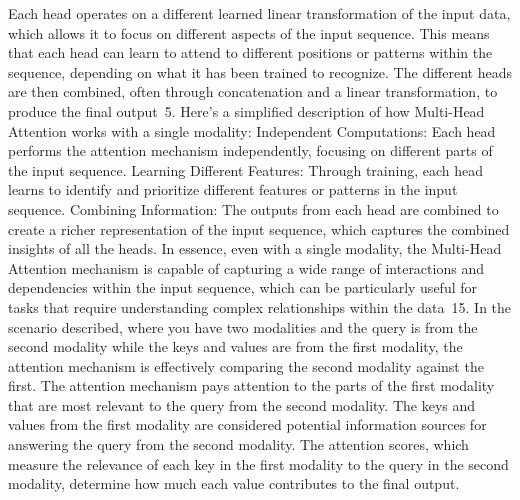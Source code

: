 \documentclass{article}%
\begin{document}
\newline%
%
Each head operates on a different learned linear transformation of the input data, which allows it to focus on different aspects of the input sequence. This means that each head can learn to attend to different positions or patterns within the sequence, depending on what it has been trained to recognize. The different heads are then combined, often through concatenation and a linear transformation, to produce the final output~5.%
\newline%
\newline%
%
Here's a simplified description of how Multi{-}Head Attention works with a single modality:%
\newline%
\newline%
%
Independent Computations: Each head performs the attention mechanism independently, focusing on different parts of the input sequence.%
\newline%
\newline%
%
Learning Different Features: Through training, each head learns to identify and prioritize different features or patterns in the input sequence.%
\newline%
\newline%
%
Combining Information: The outputs from each head are combined to create a richer representation of the input sequence, which captures the combined insights of all the heads.%
\newline%
\newline%
%
In essence, even with a single modality, the Multi{-}Head Attention mechanism is capable of capturing a wide range of interactions and dependencies within the input sequence, which can be particularly useful for tasks that require understanding complex relationships within the data~15.%
\newline%
\newline%
%
In the scenario described, where you have two modalities and the query is from the second modality while the keys and values are from the first modality, the attention mechanism is effectively comparing the second modality against the first.%
\newline%
\newline%
%
The attention mechanism pays attention to the parts of the first modality that are most relevant to the query from the second modality. The keys and values from the first modality are considered potential information sources for answering the query from the second modality. The attention scores, which measure the relevance of each key in the first modality to the query in the second modality, determine how much each value contributes to the final output.%
\end{document}
